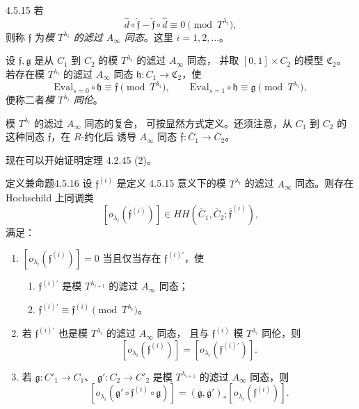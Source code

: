 \begin{definition}{4.5.15}\label{def:4-5-15}
若
\[
 \widehat d\circ\widehat{\mathfrak f}
 -\widehat{\mathfrak f}\circ\widehat d
 \equiv0\pmod{T^{\lambda_i}},
\]
则称 $\mathfrak f$ 为\emph{模 $T^{\lambda_i}$
的滤过 $A_\infty$ 同态}。这里 $i=1,2,\ldots$。
\end{definition}

设 $\mathfrak f,\mathfrak g$ 是从 $C_1$ 到 $C_2$
的模 $T^{\lambda_i}$ 的滤过 $A_\infty$ 同态，
并取 $[0,1]\times C_2$ 的模型 $\mathfrak C_2$。
若存在模 $T^{\lambda_i}$ 的滤过 $A_\infty$ 同态
$\mathfrak h\colon C_1\to\mathfrak C_2$，使
\[
 \mathrm{Eval}_{s=0}\circ\mathfrak h
 \equiv\mathfrak f\pmod{T^{\lambda_i}},
 \qquad
 \mathrm{Eval}_{s=1}\circ\mathfrak h
 \equiv\mathfrak g\pmod{T^{\lambda_i}},
\]
便称二者\emph{模 $T^{\lambda_i}$ 同伦}。

模 $T^{\lambda_i}$ 的滤过 $A_\infty$ 同态的复合，
可按显然方式定义。还须注意，从 $C_1$ 到 $C_2$
的这种同态 $\mathfrak f$，在 $R$-约化后
诱导 $A_\infty$ 同态
$\overline{\mathfrak f}\colon
\overline C_1\to\overline C_2$。

现在可以开始证明定理 4.2.45 (2)。
\begin{statement}{定义兼命题}{4.5.16}\label{defprop:4-5-16}
设 $\mathfrak f^{(i)}$ 是定义 4.5.15
意义下的模 $T^{\lambda_i}$ 的滤过
$A_\infty$ 同态。则存在 Hochschild 上同调类
\[
 [o_{\lambda_i}(\mathfrak f^{(i)})]
 \in HH(\overline C_1,\overline C_2;
 \overline{\mathfrak f}^{(i)}),
\]
满足：
\begin{enumerate}[label=\textup{(4.5.17.\arabic*)},leftmargin=5.7em]
 \item
 $[o_{\lambda_i}(\mathfrak f^{(i)})]=0$
 当且仅当存在 $\mathfrak f^{(i)\prime}$，使
 \begin{enumerate}[label=\textup{(4.5.17.1.\arabic*)},leftmargin=7.4em]
  \item
  $\mathfrak f^{(i)\prime}$ 是模
  $T^{\lambda_{i+1}}$ 的滤过 $A_\infty$ 同态；
  \item
  $\mathfrak f^{(i)\prime}\equiv
  \mathfrak f^{(i)}\pmod{T^{\lambda_i}}$。
 \end{enumerate}
 \item
 若 $\mathfrak f^{(i)\prime}$ 也是模
 $T^{\lambda_i}$ 的滤过 $A_\infty$ 同态，
 且与 $\mathfrak f^{(i)}$ 模 $T^{\lambda_i}$
 同伦，则
 \[
 [o_{\lambda_i}(\mathfrak f^{(i)})]
 =[o_{\lambda_i}(\mathfrak f^{(i)\prime})].
 \]
 \item
 若 $\mathfrak g\colon C'_1\to C_1$、
 $\mathfrak g'\colon C_2\to C'_2$
 是模 $T^{\lambda_{i+1}}$ 的滤过
 $A_\infty$ 同态，则
 \[
 [o_{\lambda_i}(\mathfrak g'\circ
 \mathfrak f^{(i)}\circ\mathfrak g)]
 =(\overline{\mathfrak g},
 \overline{\mathfrak g}')_*
 [o_{\lambda_i}(\mathfrak f^{(i)})].
 \]
\end{enumerate}
\end{statement}

